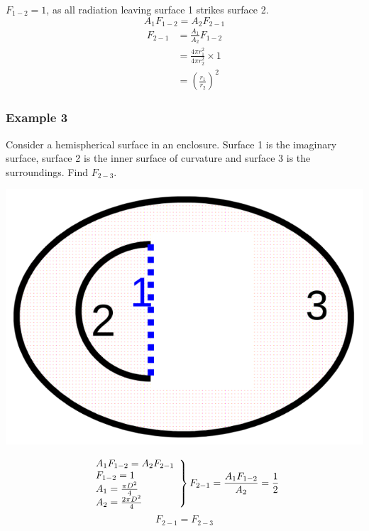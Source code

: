 \documentclass[11pt]{article}
\begin{document}
\(F_{1-2} = 1\), as all radiation leaving surface 1 strikes surface 2.
\[A_1 F_{1-2} = A_2 F_{2-1}\]
\begin{align*}
F_{2-1} &= \frac{A_1}{A_2} F_{1-2} \\
&= \frac{4 \pi r_1^2}{4 \pi r_2^2} \times 1 \\
&= \left(\frac{r_1}{r_2} \right)^2
\end{align*}

 \newpage

\subsubsection{Example 3}
\label{sec:orga56ab32}
Consider a hemispherical surface in an enclosure. Surface 1 is the imaginary surface, surface 2 is the inner surface of curvature and surface 3 is the surroundings. Find \(F_{2-3}\).
\begin{center}
\includegraphics[width=.9\linewidth]{./images/reciprocity-relation-example-3-diagram.png}
\end{center}

\begin{displaymath}
\left.\begin{array}{lr}
A_1 F_{1-2} = A_2 F_{2-1} \\
F_{1-2} = 1 \\
A_1 = \frac{\pi D^2}{4} \\
A_2 = \frac{2 \pi D^2}{4}
\end{array} \right\} F_{2-1} = \frac{A_1 F_{1-2}}{A_2} = \frac{1}{2} \\
\end{displaymath}
\[F_{2-1} = F_{2-3}\]

 \newpage
\end{document}
